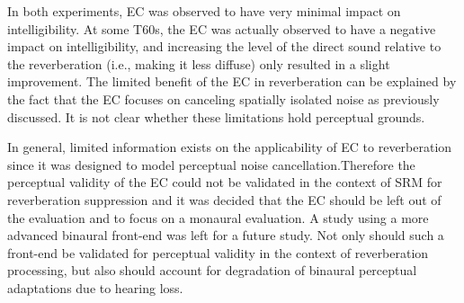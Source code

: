 In both experiments, EC was observed to have very minimal impact on intelligibility. At some T60s, the EC was actually observed to have a negative impact on intelligibility, and increasing the level of the direct sound relative to the reverberation (i.e., making it less diffuse) only resulted in a slight improvement. The limited benefit of the EC in reverberation can be explained by the fact that the EC focuses on canceling spatially isolated noise as previously discussed. It is not clear whether these limitations hold perceptual grounds. 

In general, limited information exists on the applicability of EC to reverberation since it was designed to model perceptual noise cancellation.Therefore the perceptual validity of the EC could not be validated in the context of SRM for reverberation suppression and it was decided that the EC should be left out of the evaluation and to focus on a monaural evaluation. A study using a more advanced binaural front-end was left for a future study. Not only should such a front-end be validated for perceptual validity in the context of reverberation processing, but also should account for degradation of binaural perceptual adaptations due to hearing loss.









